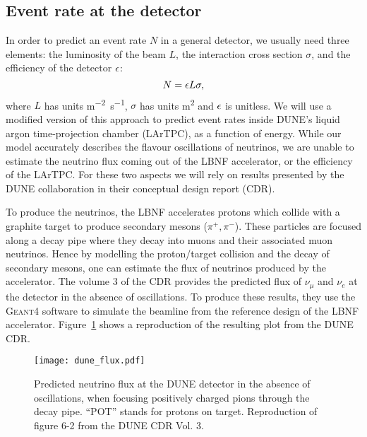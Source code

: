 \subsection{Event rate at the detector}\label{sec:event}
In order to predict an event rate $N$ in a general detector, we usually need three
elements: the luminosity of the beam $L$, the interaction cross section $\sigma$, and the
efficiency of the detector $\epsilon$:
\begin{equation}N = \epsilon L \sigma,\label{eq:rate}\end{equation}
where $L$ has units \si{\m^{-2} \s^{-1}}, $\sigma$ has units \si{\m^2} and
$\epsilon$ is unitless.
We will use a modified version of this approach to predict event rates inside
DUNE's liquid argon time-projection chamber (LArTPC), as a function of
energy. While our model
accurately describes the flavour oscillations of neutrinos, we are unable to
estimate the neutrino flux coming out of the LBNF accelerator, or the
efficiency of the LArTPC. For these two aspects we will rely on results
presented by the DUNE collaboration in their conceptual design report (CDR).

To produce the neutrinos, the LBNF accelerates protons which collide with a
graphite target to produce secondary mesons ($\pi^+, \pi^-$). These particles are focused
along a decay pipe where they decay into muons and their associated muon
neutrinos\cite{papadimitriou}. Hence by modelling the proton/target collision and the
decay of secondary mesons, one can estimate the flux of neutrinos produced by
the accelerator. The volume 3 of the CDR\cite{cdr_vol3} provides the predicted
flux of $\nu_\mu$ and $\nu_e$ at the detector in the absence of oscillations.
To produce these results, they use the \textsc{Geant4}\cite{Geant4} software to simulate
the beamline from the reference design of the LBNF accelerator.
Figure~\ref{fig:nuflux} shows a reproduction of the resulting plot from the DUNE CDR.
\begin{figure}
	\centering
	\texttt{[image: dune\_flux.pdf]}
	\caption{Predicted neutrino flux at the DUNE detector in the absence of
	oscillations, when focusing positively charged pions through the decay pipe. 
	``POT'' stands for protons on target.
	Reproduction of figure 6-2 from the DUNE CDR Vol.
	3\cite{cdr_vol3}.}
	\label{fig:nuflux}
\end{figure}

